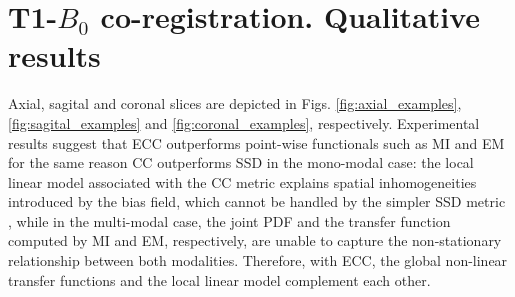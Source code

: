 \documentclass[journal]{IEEEtran}
\begin{document}
\section{T1-$B_{0}$ co-registration. Qualitative results}
Axial, sagital and coronal slices are depicted in Figs. \ref{fig:axial_examples}, \ref{fig:sagital_examples} and \ref{fig:coronal_examples}, respectively. Experimental results suggest that ECC outperforms point-wise functionals such as MI and EM for the same reason CC outperforms SSD in the mono-modal case: the local linear model associated with the CC metric explains spatial inhomogeneities introduced by the bias field, which cannot be handled by the simpler SSD metric \cite{Wang2014}, while in the multi-modal case, the joint PDF and the transfer function computed by MI and EM, respectively, are unable to capture the non-stationary relationship between both modalities. Therefore, with ECC, the global non-linear transfer functions and the local linear model complement each other.
\end{document}
